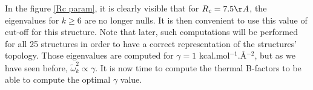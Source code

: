 \noindent In the figure \ref{Rc param}, it is clearly visible that for $R_c = 7.5\AA$, the eigenvalues for $k \ge 6$ are no longer nulls. It is then convenient to use this value of cut-off for this structure. Note that later, such computations will be performed for all 25 structures in order to have a correct representation of the structures' topology. Those eigenvalues are computed for $\gamma = 1$ kcal.mol$^{-1}$.\AA$^{-2}$, but as we have seen before, $\tilde{\omega}_k^2 \propto \gamma$. It is now time to compute the thermal B-factors to be able to compute the optimal $\gamma$ value.

